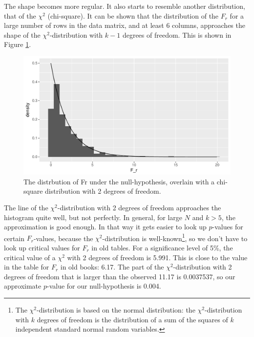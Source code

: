 \documentclass[]{report}\usepackage[]{graphicx}\usepackage[]{color}
\makeatletter
\def\maxwidth{ %
  \ifdim\Gin@nat@width>\linewidth
    \linewidth
  \else
    \Gin@nat@width
  \fi
}
\newenvironment{knitrout}{}{} %
\makeatother
\begin{document}
The shape becomes more regular. It also starts to resemble another distribution, that of the $\chi^2$ (chi-square). It can be shown that the distribution of the $F_r$ for a large number of rows in the data matrix, and at least 6 columns, approaches the shape of the $\chi^2$-distribution with $k-1$ degrees of freedom. This is shown in Figure \ref{fig:nonparmixed_56}.

\begin{knitrout}
\color{fgcolor}\begin{figure}

{\centering \includegraphics[width=\maxwidth]{figure/nonparmixed_56-1} 

}

\caption[The distrbution of Fr under the null-hypothesis, overlain with a chi-square distribution with 2 degrees of freedom]{The distrbution of Fr under the null-hypothesis, overlain with a chi-square distribution with 2 degrees of freedom.}\label{fig:nonparmixed_56}
\end{figure}


\end{knitrout}

The line of the $\chi^2$-distribution with 2 degrees of freedom approaches the histogram quite well, but not perfectly. In general, for large $N$ and $k>5$, the approximation is good enough. In that way it gets easier to look up $p$-values for certain $F_r$-values, because the $\chi^2$-distribution is well-known\footnote{The $\chi^2$-distribution is based on the normal distribution: the $\chi^2$-distribution with $k$ degrees of freedom is the distribution of a sum of the squares of $k$ independent standard normal random variables.}, so we don't have to look up critical values for $F_r$ in old tables. For a significance level of 5\%, the critical value of a $\chi^2$ with 2 degrees of freedom is 5.991. This is close to the value in the table for $F_r$ in old books: 6.17. The part of the $\chi^2$-distribution with 2 degrees of freedom that is larger than the observed 11.17 is 0.0037537, so our approximate $p$-value for our null-hypothesis is 0.004.
\end{document}
